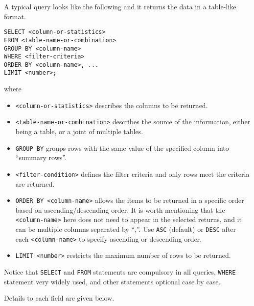A typical query looks like the following and it returns the data in a table-like format.
\begin{lstlisting}
SELECT <column-or-statistics>
FROM <table-name-or-combination>
GROUP BY <column-name>
WHERE <filter-criteria>
ORDER BY <column-name>, ...
LIMIT <number>;
\end{lstlisting}
where
\begin{itemize}
\item \verb|<column-or-statistics>| describes the columns to be returned.
\item \verb|<table-name-or-combination>| describes the source of the information, either being a table, or a joint of multiple tables.
\item \verb|GROUP BY| groups rows with the same value of the specified column into ``summary rows''.
\item \verb|<filter-condition>| defines the filter criteria and only rows meet the criteria are returned.
\item \verb|ORDER BY <column-name>| allows the items to be returned in a specific order based on ascending/descending order. It is worth mentioning that the \verb|<column-name>| here does not need to appear in the selected returns, and it can be multiple columns separated by ``,''. Use \verb|ASC| (default) or \verb|DESC| after each \verb|<column-name>| to specify ascending or descending order.
\item \verb|LIMIT <number>| restricts the maximum number of rows to be returned.
\end{itemize}

Notice that \verb|SELECT| and \verb|FROM| statements are compulsory in all queries, \verb|WHERE| statement very widely used, and other statements optional case by case.

Details to each field are given below.


